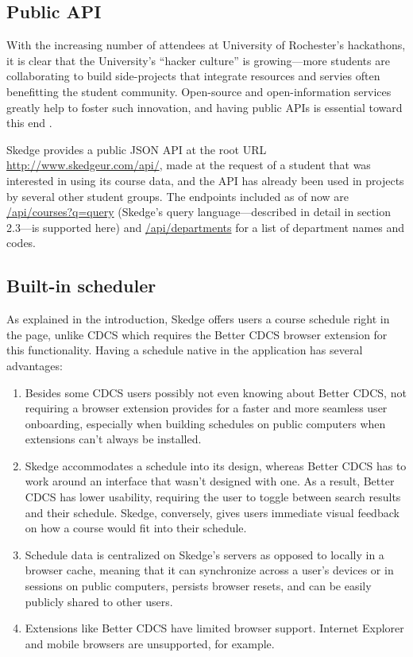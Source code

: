 \subsection{Public API}

With the increasing number of attendees at University of Rochester's hackathons, it is clear that the University's ``hacker culture'' is growing---more students are collaborating to build side-projects that integrate resources and servies often benefitting the student community. Open-source and open-information services greatly help to foster such innovation, and having public APIs is essential toward this end \cite{Milberry}\cite{hackers}.

Skedge provides a public JSON API at the root URL \url{http://www.skedgeur.com/api/}, made at the request of a student that was interested in using its course data, and the API has already been used in projects by several other student groups. The endpoints included as of now are \url{/api/courses?q=query} (Skedge's query language---described in detail in section 2.3---is supported here) and \url{/api/departments} for a list of department names and codes.

\subsection{Built-in scheduler}

As explained in the introduction, Skedge offers users a course schedule right in the page, unlike CDCS which requires the Better CDCS browser extension for this functionality. Having a schedule native in the application has several advantages:

\begin{enumerate}
\item Besides some CDCS users possibly not even knowing about Better CDCS, not requiring a browser extension provides for a faster and more seamless user onboarding, especially when building schedules on public computers when extensions can't always be installed.

\item Skedge accommodates a schedule into its design, whereas Better CDCS has to work around an interface that wasn't designed with one. As a result, Better CDCS has lower usability, requiring the user to toggle between search results and their schedule. Skedge, conversely, gives users immediate visual feedback on how a course would fit into their schedule.

\item Schedule data is centralized on Skedge's servers as opposed to locally in a browser cache, meaning that it can synchronize across a user's devices or in sessions on public computers, persists browser resets, and can be easily publicly shared to other users.

\item Extensions like Better CDCS have limited browser support. Internet Explorer and mobile browsers are unsupported, for example.
\end{enumerate}
